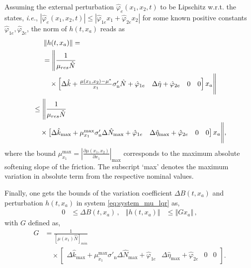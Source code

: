\documentclass[journal,twoside,web]{ieeecolor}
\newcommand{\abs}[1]{\left| #1 \right|}
\begin{document}
Assuming the external perturbation $\hat{\varphi}_e(x_1,x_2,t)$ to be Lipschitz w.r.t. the states, \textit{i.e.}, $\abs{\hat{\varphi}_e(x_1,x_2,t)}\leq \abs{\hat{\varphi}_{1e}x_1 + \hat{\varphi}_{2e}x_2}$ for some known positive constants $\hat{\varphi}_{1e},\hat{\varphi}_{2e}$, the norm of $h(t,x_a)$ reads as
{\small
\begin{align*}
\displaystyle
&\left\Vert h(t,x_a) \right\Vert  = \\
&= \Bigg\| \frac{1}{\mu_{res} \hat{N}} \\ & \quad \times
\begin{bmatrix}
\Delta \hat{k}  + \frac{\mu(x_1,x_2)  - \mu^*}{x_1}  \sigma'_{\mathrm{n}} \hat{N} + \hat{\varphi}_{1e} & \Delta \hat{\eta} + \hat{\varphi}_{2e} & 0 & 0
\end{bmatrix}
x_a
\Bigg\| 
\end{align*}}
\vspace{-5pt}
{\footnotesize
\begin{align*}
\displaystyle
&\leq \Bigg\| \frac{1}{\mu_{res} \hat{N}} \\ & \quad \times
\begin{bmatrix}\Delta \hat{k}_{\mathrm{max}} + \mu^{\mathrm{max}}_{x_1} \sigma'_{\mathrm{n}} \Delta \hat{N}_{\mathrm{max}} + \hat{\varphi}_{1e} & \Delta \hat{\eta}_{\mathrm{max}} + \hat{\varphi}_{2e} & 0 & 0 \end{bmatrix} x_a \Bigg\|,
\end{align*}}
\hspace{-5pt}where the bound $\mu^{\mathrm{max}}_{x_1}=\left| \frac{\partial \mu(x_1,x_2) }{\partial x_1} \right|_{\mathrm{max}}$ corresponds to the maximum absolute softening slope of the friction. The subscript `max' denotes the maximum variation in absolute term from the respective nominal values.

Finally, one gets the bounds of the variation coefficient $\Delta B(t,x_a)$ and perturbation $h(t,x_a)$ in system \eqref{eq:system_mu_lqr} as,
\begin{align}
0 &\leq \Delta B(t,x_a) \,, & \left\Vert h(t,x_a) \right \Vert &\leq \left\Vert G x_a \right \Vert \,,
\label{eq:lipschitz1}
\end{align}
with $G$ defined as,
{\small
\begin{equation}
\begin{split}
G &= \frac{1}{[\mu(x_1) \hat{N}]_{min}} \\ 
& \quad \times \begin{bmatrix}\Delta \hat{k}_{\mathrm{max}} + \mu^{\mathrm{max}}_{\tilde{x}_1} \sigma'_{\mathrm{n}} \Delta \hat{N}_{\mathrm{max}} + \hat{\varphi}_{1e} & \Delta \hat{\eta}_{\mathrm{max}} + \hat{\varphi}_{2e} & 0 & 0 \end{bmatrix}.
\end{split}
\label{eq:lipschitz2}
\end{equation}}   
\end{document}
